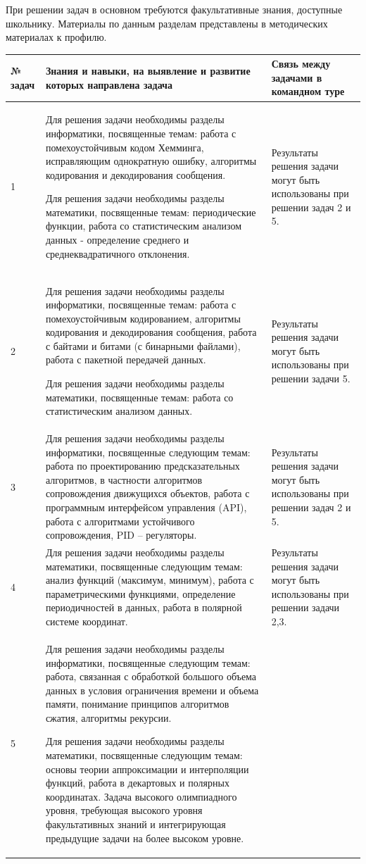 При решении задач в основном требуются факультативные знания, доступные школьнику. Материалы по данным разделам представлены в методических материалах к профилю.

\begin{center}
\small
\begin{longtable}{|p{2cm}|p{10cm}|p{3cm}|}
\hline
\textbf{№ задач}&\textbf{Знания и навыки, на выявление и развитие которых направлена задача}& \textbf{Связь между задачами в командном туре} \\
\hline
1& Для решения задачи необходимы разделы информатики, посвященные темам: работа с помехоустойчивым кодом Хемминга, исправляющим однократную ошибку, алгоритмы кодирования и декодирования сообщения. 

Для решения задачи необходимы разделы математики, посвященные темам: периодические функции, работа со статистическим анализом данных - определение среднего и среднеквадратичного отклонения.& Результаты решения задачи могут быть использованы при решении задач 2 и 5. \\
\hline
2& Для решения задачи необходимы разделы информатики, посвященные темам: работа с помехоустойчивым кодированием, алгоритмы кодирования и декодирования сообщения, работа с байтами и битами (с бинарными файлами), работа с пакетной передачей данных. 

Для решения задачи необходимы разделы математики, посвященные темам: работа со статистическим анализом данных.& Результаты решения задачи могут быть использованы при решении задачи 5. \\
\hline
3& Для решения задачи необходимы разделы информатики, посвященные следующим темам: работа по проектированию предсказательных алгоритмов, в частности алгоритмов сопровождения движущихся объектов, работа с программным интерфейсом управления (API), работа с алгоритмами устойчивого сопровождения, PID – регуляторы.& Результаты решения задачи могут быть использованы при решении задач 2 и 5. \\
\hline
4& Для решения задачи необходимы разделы математики, посвященные следующим темам: анализ функций (максимум, минимум), работа с параметрическими функциями, определение периодичностей в данных, работа в полярной системе координат.& Результаты решения задачи могут быть использованы при решении задачи 2,3.\\
\hline
5& Для решения задачи необходимы разделы информатики, посвященные следующим темам: работа, связанная с обработкой большого объема данных в условия ограничения времени и объема памяти, понимание принципов алгоритмов сжатия, алгоритмы рекурсии.

Для решения задачи необходимы разделы математики, посвященные следующим темам: основы теории аппроксимации и интерполяции функций, работа в декартовых и полярных координатах.
Задача высокого олимпиадного уровня, требующая высокого уровня факультативных знаний и интегрирующая предыдущие задачи на более высоком уровне.& \\
\hline
\end{longtable}
\end{center}